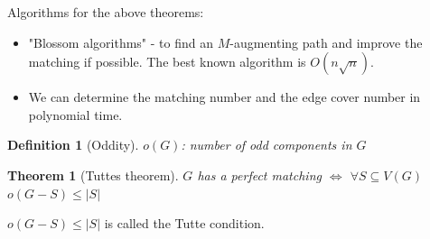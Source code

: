 \documentclass[notitlepage, 12pt]{article}
\newtheorem*{definition}{Definition}
\newtheorem*{theorem}{Theorem}
\begin{document}
Algorithms for the above theorems:
\begin{itemize}
  \item "Blossom algorithms" - to find an $M$-augmenting path and improve the matching
  if possible. The best known algorithm is $O(n\sqrt{n})$.
  \item We can determine the matching number and the edge cover number in polynomial time.
\end{itemize}
\vspace{1cm}
\begin{definition}[Oddity]
  $o(G)$: number of odd components in $G$
\end{definition}
\begin{theorem}[Tuttes theorem]
  $G$ has a perfect matching $\iff$ $\forall S \subseteq V(G)$ $o(G-S) \leq |S|$
\end{theorem}
$o(G-S) \leq |S|$ is called the Tutte condition.
\end{document}
